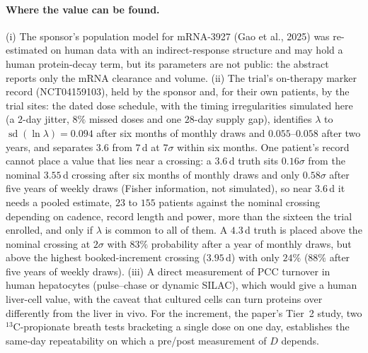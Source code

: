 \documentclass[11pt,a4paper]{article}
\newcommand{\sdl}[1]{\operatorname{sd}(\ln #1)}
\begin{document}
\paragraph{Where the value can be found.} (i) The sponsor's population model for mRNA-3927
(Gao et al., 2025) was re-estimated on human data with an indirect-response structure and may
hold a human protein-decay term, but its parameters are not public: the abstract reports only
the mRNA clearance and volume. (ii) The trial's on-therapy marker record
(NCT04159103), held by the sponsor and, for their own patients, by the trial sites: the dated
dose schedule, with the timing irregularities simulated here (a $2$-day jitter, $8\%$ missed
doses and one $28$-day supply gap), identifies $\lambda$ to $\sdl{\lambda}=0.094$ after six
months of monthly draws and $0.055$--$0.058$ after two years, and separates $3.6$ from $7$\,d at $7\sigma$ within six months.
One patient's record cannot place a value that lies near a crossing: a $3.6$\,d truth sits
$0.16\sigma$ from the nominal $3.55$\,d crossing after six months of monthly draws and only
$0.58\sigma$ after five years of weekly draws (Fisher information, not simulated), so near
$3.6$\,d it needs a pooled estimate, $23$ to $155$ patients against the nominal crossing
depending on cadence, record length and power, more than the sixteen the trial enrolled, and
only if $\lambda$ is common to all of them.
A $4.3$\,d truth is placed above the nominal crossing at $2\sigma$ with $83\%$ probability after a year of
monthly draws, but above the highest booked-increment crossing ($3.95$\,d) with only $24\%$
($88\%$ after five years of weekly draws).
(iii) A direct measurement of PCC turnover in human hepatocytes (pulse--chase or dynamic
SILAC), which would give a human liver-cell value, with the caveat that cultured cells can turn
proteins over differently from the liver in vivo. For the increment, the paper's Tier~2 study,
two $^{13}$C-propionate breath tests bracketing a single dose on one day, establishes the
same-day repeatability on which a pre/post measurement of $D$ depends.
\end{document}
